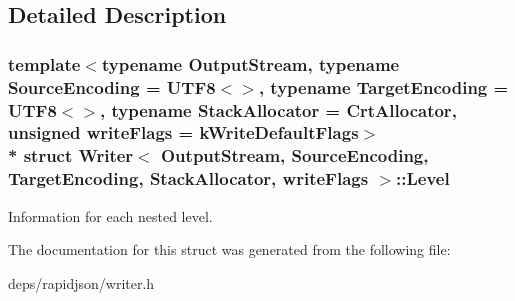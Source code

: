 \subsection{Detailed Description}
\subsubsection*{template$<$typename Output\+Stream, typename Source\+Encoding = U\+T\+F8$<$$>$, typename Target\+Encoding = U\+T\+F8$<$$>$, typename Stack\+Allocator = Crt\+Allocator, unsigned write\+Flags = k\+Write\+Default\+Flags$>$\\*
struct Writer$<$ Output\+Stream, Source\+Encoding, Target\+Encoding, Stack\+Allocator, write\+Flags $>$\+::\+Level}

Information for each nested level. 

The documentation for this struct was generated from the following file\+:\begin{DoxyCompactItemize}
\item 
deps/rapidjson/writer.\+h\end{DoxyCompactItemize}
